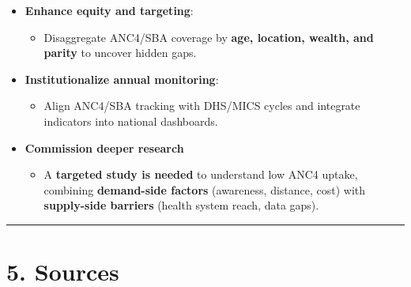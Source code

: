 \documentclass[
]{article}
\providecommand{\tightlist}{%
  \setlength{\itemsep}{0pt}\setlength{\parskip}{0pt}}
\begin{document}
\begin{itemize}
\tightlist
\item
  \textbf{Enhance equity and targeting}:

  \begin{itemize}
  \tightlist
  \item
    Disaggregate ANC4/SBA coverage by \textbf{age, location, wealth, and
    parity} to uncover hidden gaps.
  \end{itemize}
\item
  \textbf{Institutionalize annual monitoring}:

  \begin{itemize}
  \tightlist
  \item
    Align ANC4/SBA tracking with DHS/MICS cycles and integrate
    indicators into national dashboards.
  \end{itemize}
\item
  \textbf{Commission deeper research}

  \begin{itemize}
  \tightlist
  \item
    A \textbf{targeted study is needed} to understand low ANC4 uptake,
    combining \textbf{demand-side factors} (awareness, distance, cost)
    with \textbf{supply-side barriers} (health system reach, data gaps).
  \end{itemize}
\end{itemize}

\begin{center}\rule{0.5\linewidth}{0.5pt}\end{center}

\section{5. Sources}\label{sources}
\end{document}
